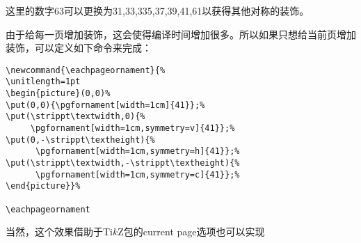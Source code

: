 \documentclass{ctexbook}
\begin{document}
\begin{tkzexample}
\usepackage{eso-pic}
\makeatletter
{}
\makeatother
\end{tkzexample}

这里的数字63可以更换为31,33,335,37,39,41,61以获得其他对称的装饰。

由于给每一页增加装饰，这会使得编译时间增加很多。所以如果只想给当前页增加装饰，可以定义如下命令来完成：
\begin{center}
\begin{verbatim}
\newcommand{\eachpageornament}{%
\unitlength=1pt
\begin{picture}(0,0)%
\put(0,0){\pgfornament[width=1cm]{41}};%
\put(\strippt\textwidth,0){%
     \pgfornament[width=1cm,symmetry=v]{41}};%
\put(0,-\strippt\textheight){%
      \pgfornament[width=1cm,symmetry=h]{41}};%
\put(\strippt\textwidth,-\strippt\textheight){%
      \pgfornament[width=1cm,symmetry=c]{41}};%
\end{picture}}%

\eachpageornament
\end{verbatim}
\end{center}

当然，这个效果借助于Ti$k$Z包的current page选项也可以实现
\begin{center}
\begin{tkzexample}
  \newcommand{\eachpageornament}{%
  \begin{tikzpicture}[remember picture, overlay]
    \node[anchor=north west] at (current page.north west){%
                      \pgfornament[width=2cm]{63}};
    \node[anchor=north east] at (current page.north east){%
                      \pgfornament[width=2cm,symmetry=v]{63}};
    \node[anchor=south west] at (current page.south west){%
                     \pgfornament[width=2cm,symmetry=h]{63}};
    \node[anchor=south east] at (current page.south east){%
                      \pgfornament[width=2cm,symmetry=c]{63}};
   \end{tikzpicture}
   }
\end{tkzexample}
\end{center}
\end{document}
